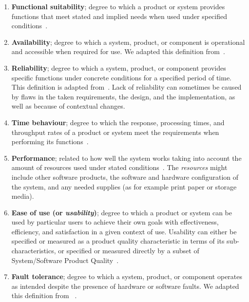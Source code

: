 \begin{enumerate}
    \item \textbf{Functional suitability}; degree to which a product or system provides functions that meet stated and implied needs when used under specified conditions~\cite{iso_25010_2011_2017}.

    \item \textbf{Availability}; degree to which a system, product, or component is operational and accessible when required for use. We adapted this definition from~\cite{iso_iec_24765_2017}.

    \item \textbf{Reliability}; degree to which a system, product, or component provides specific functions under concrete conditions for a specified period of time. This definition is adapted from~\cite{iso_iec_24765_2017}. Lack of reliability can sometimes be caused by flaws in the taken requirements, the design, and the implementation, as well as because of contextual changes.  

    \item \textbf{Time behaviour}; degree to which the response, processing times, and throughput rates of a product or system meet the requirements when performing its functions~\cite{iso_25010_2011_2017}.

    \item \textbf{Performance}; related to how well the system works taking into account the amount of resources used under stated conditions~\cite{iso_25010_2011_2017}. The \textit{resources} might include other software products, the software and hardware configuration of the system, and any needed supplies (as for example print paper or storage media).

    \item \textbf{Ease of use (or \textit{usability})}; degree to which a product or system can be used by particular users to achieve their own goals with effectiveness, efficiency, and satisfaction in a given context of use. Usability can either be specified or measured as a product quality characteristic in terms of its sub-characteristics, or specified or measured directly by a subset of System/Software Product Quality~\cite{iso_25010_2011_2017}.

    \item \textbf{Fault tolerance}; degree to which a system, product, or component operates as intended despite the presence of hardware or software faults. We adapted this definition from ~\cite{iso_iec_24765_2017}.


\end{enumerate}
